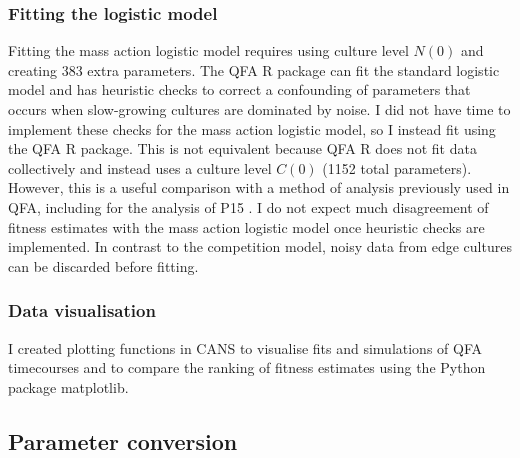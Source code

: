 \subsubsection{Fitting the logistic model}

Fitting the mass action logistic model requires using culture level
\(N(0)\) and creating 383 extra parameters. The QFA R package
\citep{qfa2016} can fit the standard logistic model and has heuristic
checks to correct a confounding of parameters that occurs when
slow-growing cultures are dominated by noise. I did not have time to
implement these checks for the mass action logistic model, so I
instead fit using the QFA R package. This is not equivalent because
QFA R does not fit data collectively and instead uses a culture level
\(C(0)\) (1152 total parameters). However, this is a useful comparison
with a method of analysis previously used in QFA, including for the
analysis of P15 \citep{Addinall2011}. I do not expect much
disagreement of fitness estimates with the mass action logistic model
once heuristic checks are implemented. In contrast to the competition
model, noisy data from edge cultures can be discarded before fitting.

\subsubsection{Data visualisation}

I created plotting functions in CANS to visualise fits and simulations
of QFA timecourses and to compare the ranking of fitness estimates
using the Python package matplotlib.

\subsection{Parameter conversion}
\label{sec:parameter_conversion}

